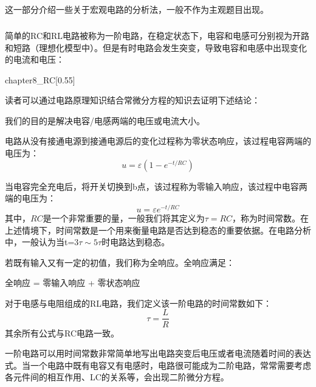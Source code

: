 \subsection[一阶电路与复杂电路*]{}
这一部分介绍一些关于宏观电路的分析法，一般不作为主观题目出现。
\subsubsection[一阶电路]{}
简单的RC和RL电路被称为一阶电路，在稳定状态下，电容和电感可分别视为开路和短路（理想化模型中）。但是有时电路会发生突变，导致电容和电感中出现变化的电流和电压：
\begin{singlefigure}[简单一阶RC电路]{chapter8_RC}[0.55]
\end{singlefigure}

读者可以通过电路原理知识结合常微分方程的知识去证明下述结论：
\begin{law}
    我们的目的是解决电容/电感两端的电压或电流大小。

    电路从没有接通电源到接通电源后的变化过程称为零状态响应，该过程电容两端的电压为：
    \[u=\varepsilon(1-e^{-t/RC})\]

    当电容完全充电后，将开关切换到b点，该过程称为零输入响应，该过程中电容两端的电压为：
    \[u=\varepsilon e^{-t/RC}\]
    其中，$RC$是一个非常重要的量，一般我们将其定义为$\tau=RC$，称为时间常数。在上述情境下，时间常数是一个用来衡量电路是否达到稳态的重要依据。在电路分析中，一般认为当t=$3\tau \sim5\tau$时电路达到稳态。

    若既有输入又有一定的初值，我们称为全响应。全响应满足：
    \begin{center}
        全响应 = 零输入响应 + 零状态响应
    \end{center}

    对于电感与电阻组成的RL电路，我们定义该一阶电路的时间常数如下：
    \[\tau=\dfrac{L}{R}\]
    其余所有公式与RC电路一致。
\end{law}

一阶电路可以用时间常数非常简单地写出电路突变后电压或者电流随着时间的表达式。当一个电路中既有电容又有电感时，电路很可能成为二阶电路，常常需要考虑各元件间的相互作用、LC的关系等，会出现二阶微分方程。

